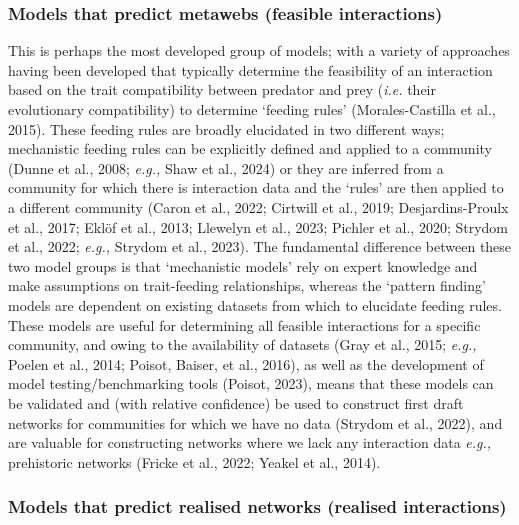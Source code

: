 \documentclass[
]{article}
\begin{document}
\subsubsection{Models that predict metawebs (feasible
interactions)}\label{models-that-predict-metawebs-feasible-interactions}

This is perhaps the most developed group of models; with a variety of
approaches having been developed that typically determine the
feasibility of an interaction based on the trait compatibility between
predator and prey (\emph{i.e.} their evolutionary compatibility) to
determine `feeding rules' (Morales-Castilla et al., 2015). These feeding
rules are broadly elucidated in two different ways; mechanistic feeding
rules can be explicitly defined and applied to a community (Dunne et
al., 2008; \emph{e.g.,} Shaw et al., 2024) or they are inferred from a
community for which there is interaction data and the `rules' are then
applied to a different community (Caron et al., 2022; Cirtwill et al.,
2019; Desjardins-Proulx et al., 2017; Eklöf et al., 2013; Llewelyn et
al., 2023; Pichler et al., 2020; Strydom et al., 2022; \emph{e.g.,}
Strydom et al., 2023). The fundamental difference between these two
model groups is that `mechanistic models' rely on expert knowledge and
make assumptions on trait-feeding relationships, whereas the `pattern
finding' models are dependent on existing datasets from which to
elucidate feeding rules. These models are useful for determining all
feasible interactions for a specific community, and owing to the
availability of datasets (Gray et al., 2015; \emph{e.g.,} Poelen et al.,
2014; Poisot, Baiser, et al., 2016), as well as the development of model
testing/benchmarking tools (Poisot, 2023), means that these models can
be validated and (with relative confidence) be used to construct first
draft networks for communities for which we have no data (Strydom et
al., 2022), and are valuable for constructing networks where we lack any
interaction data \emph{e.g.,} prehistoric networks (Fricke et al., 2022;
Yeakel et al., 2014).

\subsubsection{Models that predict realised networks (realised
interactions)}\label{models-that-predict-realised-networks-realised-interactions}
\end{document}
